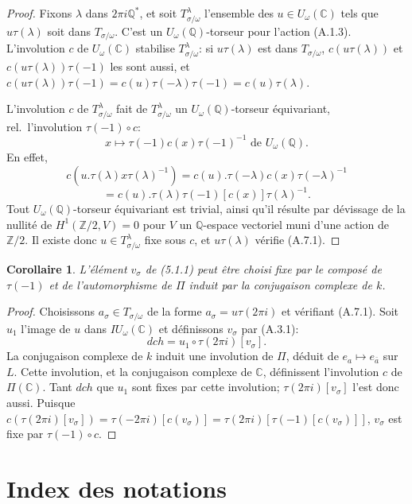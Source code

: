 \documentclass[11pt,a4paper]{article}
\theoremstyle{plain}
\newtheorem{corollary}[theorem]{Corollaire}
\theoremstyle{definition}
\newcommand{\dch}{\mathit{dch}}
\newcommand{\Q}{\mathbb{Q}}
\newcommand{\Z}{\mathbb{Z}}
\newcommand{\C}{\mathbb{C}}
\begin{document}
\begin{proof}
Fixons $\lambda$ dans $2\pi i \Q^*$, et soit $T_{\sigma/\omega}^\lambda$ l'ensemble des $u \in U_\omega(\C)$ tels que $u \tau(\lambda)$ soit dans $T_{\sigma/\omega}$. C'est un $U_\omega(\Q)$-torseur pour l'action (A.1.3). L'involution $c$ de $U_\omega(\C)$ stabilise $T_{\sigma/\omega}^\lambda$: si $u \tau(\lambda)$ est dans $T_{\sigma/\omega}$, $c(u \tau(\lambda))$ et $c(u \tau(\lambda)) \tau(-1)$ les sont aussi, et $c(u \tau(\lambda)) \tau(-1) = c(u) \tau(-\lambda) \tau(-1) = c(u) \tau(\lambda)$.

L'involution $c$ de $T_{\sigma/\omega}^\lambda$ fait de $T_{\sigma/\omega}^\lambda$ un $U_\omega(\Q)$-torseur \'equivariant, rel.~l'involution $\tau(-1) \circ c$:
\[
x \mapsto \tau(-1) c(x) \tau(-1)^{-1} \text{ de } U_\omega(\Q).
\]
En effet,
\[
c(u.\tau(\lambda) x \tau(\lambda)^{-1}) = c(u).\tau(-\lambda) c(x) \tau(-\lambda)^{-1}
\]
\[
= c(u).\tau(\lambda) \tau(-1)[c(x)] \tau(\lambda)^{-1}.
\]
Tout $U_\omega(\Q)$-torseur \'equivariant est trivial, ainsi qu'il r\'esulte par d\'evissage de la nullit\'e de $H^1(\Z/2, V) = 0$ pour $V$ un $\Q$-espace vectoriel muni d'une action de $\Z/2$. Il existe donc $u \in T_{\sigma/\omega}^\lambda$ fixe sous $c$, et $u \tau(\lambda)$ v\'erifie (A.7.1).
\end{proof}

\begin{corollary}\label{cor:A.8}
L'\'el\'ement $v_\sigma$ de (5.1.1) peut \^etre choisi fixe par le compos\'e de $\tau(-1)$ et de l'automorphisme de $\Pi$ induit par la conjugaison complexe de $k$.
\end{corollary}

\begin{proof}
Choisissons $a_\sigma \in T_{\sigma/\omega}$ de la forme $a_\sigma = u \tau(2\pi i)$ et v\'erifiant (A.7.1). Soit $u_1$ l'image de $u$ dans $IU_\omega(\C)$ et d\'efinissons $v_\sigma$ par (A.3.1):
\[
\dch = u_1 \circ \tau(2\pi i)[v_\sigma].
\]
La conjugaison complexe de $k$ induit une involution de $\Pi$, d\'eduit de $e_a \mapsto e_{\bar{a}}$ sur $L$. Cette involution, et la conjugaison complexe de $\C$, d\'efinissent l'involution $c$ de $\Pi(\C)$. Tant $\dch$ que $u_1$ sont fixes par cette involution; $\tau(2\pi i)[v_\sigma]$ l'est donc aussi. Puisque $c(\tau(2\pi i)[v_\sigma]) = \tau(-2\pi i)[c(v_\sigma)] = \tau(2\pi i)[\tau(-1)[c(v_\sigma)]]$, $v_\sigma$ est fixe par $\tau(-1) \circ c$.
\end{proof}


\section*{Index des notations}
\end{document}
